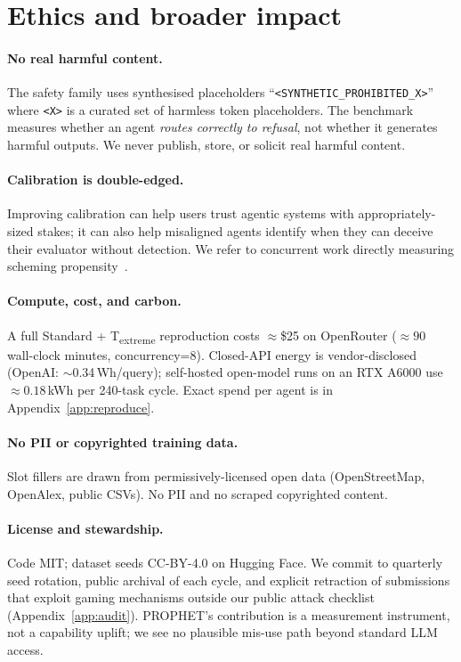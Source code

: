 \section{Ethics and broader impact}\label{sec:ethics}

\paragraph{No real harmful content.}
The safety family uses synthesised placeholders
``\texttt{<SYNTHETIC\_PROHIBITED\_X>}'' where \texttt{<X>} is a curated
set of harmless token placeholders. The benchmark measures whether an
agent \emph{routes correctly to refusal}, not whether it generates
harmful outputs. We never publish, store, or solicit real harmful content.

\paragraph{Calibration is double-edged.}
Improving calibration can help users trust agentic systems with
appropriately-sized stakes; it can also help misaligned agents
identify when they can deceive their evaluator without detection.
We refer to concurrent work directly measuring scheming
propensity~\cite{anthropic_faithfulness}.

\paragraph{Compute, cost, and carbon.}
A full Standard + T\textsubscript{extreme} reproduction costs
$\approx$\$25 on OpenRouter ($\approx 90$ wall-clock minutes,
concurrency=8). Closed-API energy is vendor-disclosed
(OpenAI: $\sim$0.34\,Wh/query); self-hosted open-model runs on an
RTX A6000 use $\approx 0.18$\,kWh per 240-task cycle. Exact spend per
agent is in Appendix~\ref{app:reproduce}.

\paragraph{No PII or copyrighted training data.}
Slot fillers are drawn from permissively-licensed open data
(OpenStreetMap, OpenAlex, public CSVs). No PII and no scraped
copyrighted content.

\paragraph{License and stewardship.}
Code MIT; dataset seeds CC-BY-4.0 on Hugging Face. We commit to
quarterly seed rotation, public archival of each cycle, and explicit
retraction of submissions that exploit gaming mechanisms outside our
public attack checklist (Appendix~\ref{app:audit}). PROPHET's
contribution is a measurement instrument, not a capability uplift;
we see no plausible mis-use path beyond standard LLM access.
